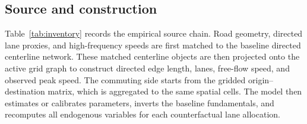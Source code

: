 \documentclass[12pt]{article}
\begin{document}
\subsection{Source and construction}\label{ssec:inventory}

Table~\ref{tab:inventory} records the empirical source chain.  Road
geometry, directed lane proxies, and high-frequency speeds are first
matched to the baseline directed centerline network.  These matched
centerline objects are then projected onto the active grid graph to
construct directed edge length, lanes, free-flow speed, and observed
peak speed.  The commuting side starts from the gridded origin--
destination matrix, which is aggregated to the same spatial cells.
The model then estimates or calibrates parameters, inverts the
baseline fundamentals, and recomputes all endogenous variables for
each counterfactual lane allocation.
\end{document}
